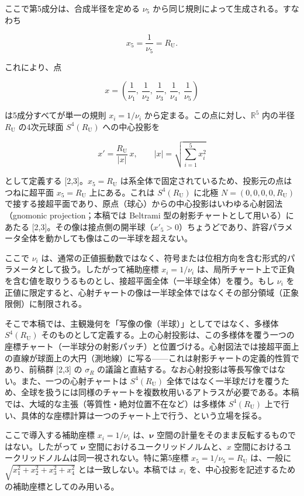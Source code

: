 \documentclass[
]{ltjsarticle}
\begin{document}
ここで第5成分は、合成半径を定める \(\nu_5\)
から同じ規則によって生成される。すなわち

\[x_5=\frac{1}{\nu_5}=R_{\mathrm U}.\]

これにより、点

\[x=\left(\frac{1}{\nu_1},\ \frac{1}{\nu_2},\ \frac{1}{\nu_3},\ \frac{1}{\nu_4},\ \frac{1}{\nu_5}\right)\]

は5成分すべてが単一の規則 \(x_i=1/\nu_i\)
から定まる。この点に対し、\(\mathbb{R}^5\) 内の半径 \(R_{\mathrm U}\)
の4次元球面 \(S^4(R_{\mathrm U})\) への中心投影を

\[x'=\frac{R_{\mathrm U}}{|x|}\,x,\qquad |x|=\sqrt{\textstyle\sum_{i=1}^{5}x_i^2}\]

として定義する {[}2,3{]}。\(x_5=R_{\mathrm U}\)
は系全体で固定されているため、投影元の点はつねに超平面
\(x_5=R_{\mathrm U}\) 上にある。これは \(S^4(R_{\mathrm U})\) に北極
\(N=(0,0,0,0,R_{\mathrm U})\)
で接する接超平面であり、原点（球心）からの中心投影はいわゆる心射図法（gnomonic
projection；本稿では Beltrami 型の射影チャートとして用いる）にあたる
{[}2,3{]}。その像は接点側の開半球（\(x'_5>0\)）ちょうどであり、許容パラメータ全体を動かしても像はこの一半球を超えない。

ここで \(\nu_i\)
は、通常の正値振動数ではなく、符号または位相方向を含む形式的パラメータとして扱う。したがって補助座標
\(x_i=1/\nu_i\)
は、局所チャート上で正負を含む値を取りうるものとし、接超平面全体（一半球全体）を覆う。もし
\(\nu_i\)
を正値に限定すると、心射チャートの像は一半球全体ではなくその部分領域（正象限側）に制限される。

そこで本稿では、主観幾何を「写像の像（半球）」としてではなく、多様体
\(S^4(R_{\mathrm U})\)
そのものとして定義する。上の心射投影は、この多様体を覆う一つの座標チャート（一半球分の射影パッチ）と位置づける。心射図法では接超平面上の直線が球面上の大円（測地線）に写る------これは射影チャートの定義的性質であり、前稿群
{[}2,3{]} の \(\sigma_R\)
の議論と直結する。なお心射投影は等長写像ではない。また、一つの心射チャートは
\(S^4(R_{\mathrm U})\)
全体ではなく一半球だけを覆うため、全球を扱うには同様のチャートを複数枚用いるアトラスが必要である。本稿では、大域的な主張（等質性・絶対位置不在など）は多様体
\(S^4(R_{\mathrm U})\)
上で行い、具体的な座標計算は一つのチャート上で行う、という立場を採る。

ここで導入する補助座標 \(x_i=1/\nu_i\) は、\(\boldsymbol{\nu}\)
空間の計量をそのまま反転するものではない。したがって
\(\boldsymbol{\nu}\) 空間におけるユークリッドノルムと、\(x\)
空間におけるユークリッドノルムは同一視されない。特に第5座標
\(x_5=1/\nu_5=R_{\mathrm U}\) は、一般に
\(\sqrt{x_1^2+x_2^2+x_3^2+x_4^2}\) とは一致しない。本稿では \(x_i\)
を、中心投影を記述するための補助座標としてのみ用いる。
\end{document}
